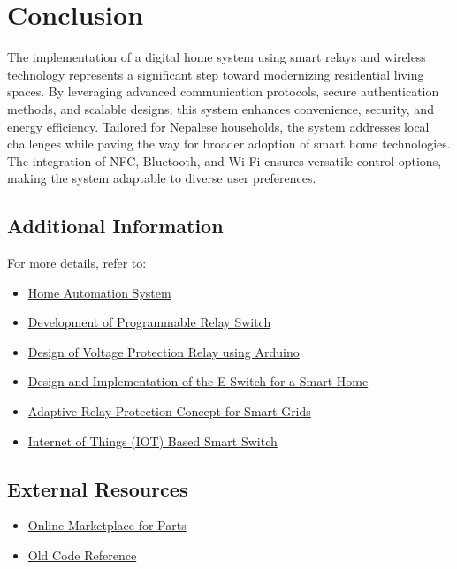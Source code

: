 \section{Conclusion}\label{sec:conclusion}
The implementation of a digital home system using smart relays and wireless technology represents a significant step toward modernizing residential living spaces. By leveraging advanced communication protocols, secure authentication methods, and scalable designs, this system enhances convenience, security, and energy efficiency. Tailored for Nepalese households, the system addresses local challenges while paving the way for broader adoption of smart home technologies. The integration of NFC, Bluetooth, and Wi-Fi ensures versatile control options, making the system adaptable to diverse user preferences.

\subsection*{Additional Information}
For more details, refer to:
\begin{itemize}
	\item \href{storage/Home\_Automation.pdf}{Home Automation System}
	\item \href{storage/Development\_of\_Programmable\_Relay\_Switch.pdf}{Development of Programmable Relay Switch}
	\item \href{storage/Design-of-volatage-protection-relay.pdf}{Design of Voltage Protection Relay using Arduino}
	\item \href{storage/sensors-21-03811-v3.pdf}{Design and Implementation of the E-Switch for a Smart Home}
	\item \href{storage/SMART\_AND\_MICRO\_GRIDS5\_Full\_paper.pdf}{Adaptive Relay Protection Concept for Smart Grids}
	\item \href{storage/Internet\_of\_Things\_IOT\_Based\_Smart\_Switc.pdf}{Internet of Things (IOT) Based Smart Switch}
\end{itemize}

\subsection*{External Resources}
\begin{itemize}
	\item \href{https://www.digikey.com/en/products/result?s=N4IgTCBcDaIEoFMA2BDAniAugXyA}{Online Marketplace for Parts}
	\item \href{https://github.com/vbier/RemoteRelay.git}{Old Code Reference}
\end{itemize}
